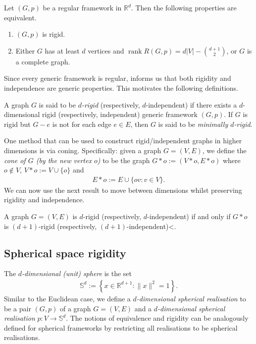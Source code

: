 \documentclass[ALCO]{cedram}
\DeclareMathOperator{\rank}{rank}
\begin{document}
\begin{theorem}\label{t:asimowroth}
	Let $(G,p)$ be a regular framework in $\mathbb{R}^d$.
	Then the following properties are equivalent.
	\begin{enumerate}
		\item \label{t:asimowroth1} $(G,p)$ is rigid.
		\item \label{t:asimowroth2} Either $G$ has at least $d$ vertices and $\rank R(G,p) = d|V| - \binom{d+1}{2}$, or $G$ is a complete graph.
	\end{enumerate}
\end{theorem}

Since every generic framework is regular,
 informs us that both rigidity and independence are generic properties.
This motivates the following definitions.

\begin{definition}
	A graph $G$ is said to be \emph{$d$-rigid} (respectively, $d$-independent) if there exists a $d$-dimensional rigid (respectively, independent) generic framework $(G,p)$.
	If $G$ is rigid but $G-e$ is not for each edge $e \in E$,
	then $G$ is said to be \emph{minimally $d$-rigid}.
\end{definition}

One method that can be used to construct rigid/independent graphs in higher dimensions is via coning.
Specifically:
given a graph $G=(V,E)$,
we define the \emph{cone of $G$ (by the new vertex $o$)} to be the graph $G*o := (V*o, E*o)$ where $o \notin V$, $V*o := V \cup \{o\}$ and 
\begin{align*}
	E*o := E \cup \{ o v : v \in V\}.
\end{align*}
We can now use the next result to move between dimensions whilst preserving rigidity and independence.

\begin{theorem}\label{t:cone}
	A graph $G=(V,E)$ is $d$-rigid \textup{(}respectively, $d$-independent\textup{)} if and only if $G*o$ is $(d+1)$-rigid \textup{(}respectively, $(d+1)$-independent\textup{)}<.
\end{theorem}
 




\subsection{Spherical space rigidity}

The \emph{$d$-dimensional (unit) sphere} is the set
\begin{align*}
	\mathbb{S}^d := \left\{ x \in \mathbb{R}^{d+1} : \|x\|^2=1 \right\}.
\end{align*}
Similar to the Euclidean case, we define a \emph{$d$-dimensional spherical realisation} to be a pair $(G,p)$ of a graph $G=(V,E)$ and a \emph{$d$-dimensional spherical realisation} \mbox{$p: V \rightarrow \mathbb{S}^d$}.
The notions of equivalence and rigidity can be analogously defined for spherical frameworks by restricting all realisations to be spherical realisations.
\end{document}
